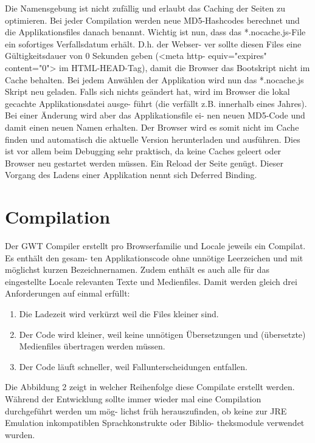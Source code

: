 \documentclass[a4paper,10pt]{scrreprt}
\begin{document}
Die Namensgebung ist nicht zufällig und erlaubt das Caching der Seiten zu optimieren. Bei jeder
Compilation werden neue MD5-Hashcodes berechnet und die Applikationsfiles danach benannt.
Wichtig ist nun, dass das *.nocache.js-File ein sofortiges Verfallsdatum erhält. D.h. der Webser-
ver sollte diesen Files eine Gültigkeitsdauer von 0 Sekunden geben (<meta http-
equiv="expires" content="0"> im HTML-HEAD-Tag), damit die Browser das Bootskript nicht
im Cache behalten. Bei jedem Anwählen der Applikation wird nun das *.nocache.js Skript neu
geladen. Falls sich nichts geändert hat, wird im Browser die lokal gecachte Applikationsdatei ausge-
führt (die verfällt z.B. innerhalb eines Jahres). Bei einer Änderung wird aber das Applikationsfile ei-
nen neuen MD5-Code und damit einen neuen Namen erhalten. Der Browser wird es somit nicht im
Cache finden und automatisch die aktuelle Version herunterladen und ausführen. Dies ist vor allem
beim Debugging sehr praktisch, da keine Caches geleert oder Browser neu gestartet werden müssen.
Ein Reload der Seite genügt.
Dieser Vorgang des Ladens einer Applikation nennt sich Deferred Binding.

\section{Compilation}
Der GWT Compiler erstellt pro Browserfamilie und Locale jeweils ein Compilat. Es enthält den gesam-
ten Applikationscode ohne unnötige Leerzeichen und mit möglichst kurzen Bezeichnernamen. Zudem
enthält es auch alle für das eingestellte Locale relevanten Texte und Medienfiles. Damit werden
gleich drei Anforderungen auf einmal erfüllt:
\begin{enumerate}
\item Die Ladezeit wird verkürzt weil die Files kleiner sind.
\item Der Code wird kleiner, weil keine unnötigen Übersetzungen und (übersetzte) Medienfiles
übertragen werden müssen.
\item Der Code läuft schneller, weil Fallunterscheidungen entfallen.
\end{enumerate}
Die Abbildung 2 zeigt in welcher Reihenfolge diese Compilate erstellt werden.
Während der Entwicklung sollte immer wieder mal eine Compilation durchgeführt werden um mög-
lichst früh herauszufinden, ob keine zur JRE Emulation inkompatiblen Sprachkonstrukte oder Biblio-
theksmodule verwendet wurden.
\end{document}
